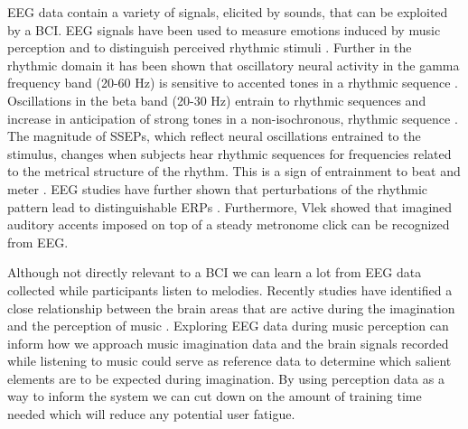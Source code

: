EEG data contain a variety of signals, elicited by sounds, that can be exploited by a \ac{BCI}. 
\ac{EEG} signals have been used to measure emotions induced by music perception \cite{lin_eeg_2009,cabredo_emotion_2012} and to distinguish perceived rhythmic stimuli \cite{stober2014nips}.
Further in the rhythmic domain it has been shown that oscillatory neural activity in the gamma frequency band (20-60 Hz) is sensitive to accented tones in a rhythmic sequence \cite{snyder_gamma-band_2005}.
Oscillations in the beta band (20-30 Hz) entrain to rhythmic sequences \cite{cirelli_beta_2014, merchant_beta_2015} and increase in anticipation of strong tones in a non-isochronous, rhythmic sequence \cite{iversen_top-down_2009,fujioka_beta_2009,fujioka_internalized_2012}.
The magnitude of \acp{SSEP}, which reflect neural oscillations entrained to the stimulus, changes when subjects hear rhythmic sequences for frequencies related to the metrical structure of the rhythm.
This is a sign of entrainment to beat and meter \cite{nozaradan_tagging_2011,nozaradan_selective_2012}. 
\ac{EEG} studies have further shown that perturbations of the rhythmic pattern lead to distinguishable \acp{ERP} \cite{geiser_early_2009}.
Furthermore, Vlek \etal \cite{vlek_shared_2011} showed that imagined auditory accents imposed on top of a steady metronome click can be recognized from EEG.

Although not directly relevant to a \ac{BCI} we can learn a lot from \ac{EEG} data collected while participants listen to melodies.
Recently studies have identified a close relationship between the brain areas that are active during the imagination and the perception of music \cite{halpern_fmri_2004,Kraemer2005,Herholz2008,herholz_2012}. 
Exploring EEG data during music perception can inform how we approach music imagination data and the brain signals recorded while listening to music could serve as reference data to determine which salient elements are to be expected during imagination. 
By using perception data as a way to inform the system we can cut down on the amount of training time needed which will reduce any potential user fatigue.

